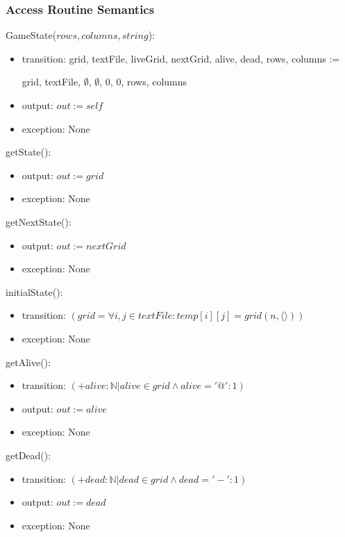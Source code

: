 \documentclass[12pt]{article}
\begin{document}
\subsubsection* {Access Routine Semantics}

\noindent GameState($rows, columns, string$):
\begin{itemize}
\item transition: grid, textFile, liveGrid, nextGrid, alive, dead, rows, columns := 

grid, textFile, $\emptyset$, $\emptyset$, 0, 0, rows, columns
\item output: $out := \mathit{self}$
\item exception: None
\end{itemize}

\noindent getState():
\begin{itemize} 
\item output: $out := grid$
\item exception: None
\end{itemize}

\noindent getNextState():
\begin{itemize}
\item output: $out := nextGrid$
\item exception: None
\end{itemize}

\noindent initialState():
\begin{itemize}
\item transition: $(grid = \forall i, j \in textFile : temp[i][j] = grid(n, \langle \rangle))$
\item exception: None
\end{itemize}

\noindent getAlive():
\begin{itemize}
\item transition: $(+alive : \mathbb{N} | alive \in grid \land alive =  '@' : 1)$
\item output: $out := alive$
\item exception: None
\end{itemize}

\noindent getDead():
\begin{itemize}
\item transition: $(+dead : \mathbb{N} | dead \in grid \land dead =  '-' : 1)$
\item output: $out := dead$
\item exception: None
\end{itemize}
\end{document}
